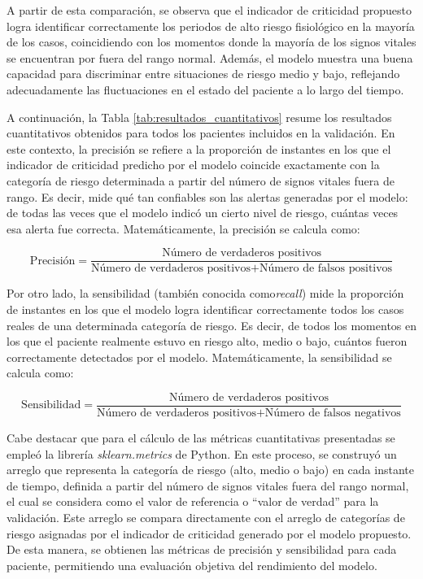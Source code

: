 A partir de esta comparación, se observa que el indicador de criticidad propuesto logra identificar correctamente los periodos de alto riesgo fisiológico en la mayoría de los casos, coincidiendo con los momentos donde la mayoría de los signos vitales se encuentran por fuera del rango normal. Además, el modelo muestra una buena capacidad para discriminar entre situaciones de riesgo medio y bajo, reflejando adecuadamente las fluctuaciones en el estado del paciente a lo largo del tiempo.

A continuación, la Tabla \ref{tab:resultados_cuantitativos} resume los resultados cuantitativos obtenidos para todos los pacientes incluidos en la validación. En este contexto, la precisión se refiere a la proporción de instantes en los que el indicador de criticidad predicho por el modelo coincide exactamente con la categoría de riesgo determinada a partir del número de signos vitales fuera de rango. Es decir, mide qué tan confiables son las alertas generadas por el modelo: de todas las veces que el modelo indicó un cierto nivel de riesgo, cuántas veces esa alerta fue correcta. Matemáticamente, la precisión se calcula como:

$$ \text{Precisión} = \frac{\text{Número de verdaderos positivos}}{\text{Número de verdaderos positivos} + \text{Número de falsos positivos}} $$

Por otro lado, la sensibilidad (también conocida como\textit{recall}) mide la proporción de instantes en los que el modelo logra identificar correctamente todos los casos reales de una determinada categoría de riesgo. Es decir, de todos los momentos en los que el paciente realmente estuvo en riesgo alto, medio o bajo, cuántos fueron correctamente detectados por el modelo. Matemáticamente, la sensibilidad se calcula como:

$$ \text{Sensibilidad} = \frac{\text{Número de verdaderos positivos}}{\text{Número de verdaderos positivos} + \text{Número de falsos negativos}} $$

Cabe destacar que para el cálculo de las métricas cuantitativas presentadas se empleó la librería \textit{sklearn.metrics} de Python. En este proceso, se construyó un arreglo que representa la categoría de riesgo (alto, medio o bajo) en cada instante de tiempo, definida a partir del número de signos vitales fuera del rango normal, el cual se considera como el valor de referencia o ``valor de verdad'' para la validación. Este arreglo se compara directamente con el arreglo de categorías de riesgo asignadas por el indicador de criticidad generado por el modelo propuesto. De esta manera, se obtienen las métricas de precisión y sensibilidad para cada paciente, permitiendo una evaluación objetiva del rendimiento del modelo.

